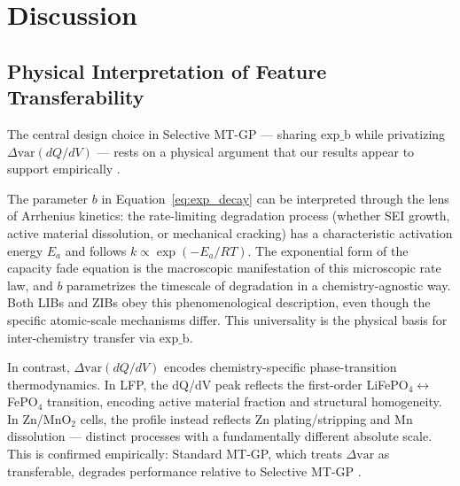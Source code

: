 \documentclass[12pt]{article}
\begin{document}
\section{Discussion}
\label{sec:discussion}

\subsection{Physical Interpretation of Feature Transferability}

The central design choice in Selective MT-GP --- sharing $\text{exp\_b}$ while
privatizing $\Delta\mathrm{var}(dQ/dV)$ --- rests on a physical argument that
our results appear to support empirically \cite{zhang2020impedance}.

The parameter $b$ in Equation~\eqref{eq:exp_decay} can be interpreted through
the lens of Arrhenius kinetics: the rate-limiting degradation process (whether
SEI growth, active material dissolution, or mechanical cracking) has a
characteristic activation energy $E_a$ and follows $k \propto \exp(-E_a / RT)$.
The exponential form of the capacity fade equation is the macroscopic
manifestation of this microscopic rate law, and $b$ parametrizes the timescale
of degradation in a chemistry-agnostic way. Both LIBs and ZIBs obey this
phenomenological description, even though the specific atomic-scale mechanisms
differ. This universality is the physical basis for inter-chemistry transfer via
$\text{exp\_b}$.

In contrast, $\Delta\mathrm{var}(dQ/dV)$ encodes chemistry-specific phase-transition thermodynamics. In LFP, the dQ/dV peak reflects the first-order LiFePO$_4 \leftrightarrow$ FePO$_4$ transition, encoding active material fraction and structural homogeneity. In Zn/MnO$_2$ cells, the profile instead reflects Zn plating/stripping and Mn dissolution --- distinct processes with a fundamentally different absolute scale. This is confirmed empirically: Standard MT-GP, which treats $\Delta\mathrm{var}$ as transferable, degrades performance relative to Selective MT-GP \cite{zhang2020impedance}.
\end{document}
